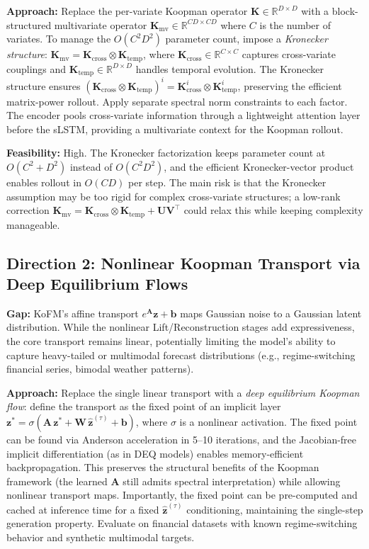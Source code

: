 \documentclass[11pt,a4paper]{article}
\begin{document}
\textbf{Approach:} Replace the per-variate Koopman operator $\mathbf{K} \in \mathbb{R}^{D \times D}$ with a block-structured multivariate operator $\mathbf{K}_{\mathrm{mv}} \in \mathbb{R}^{CD \times CD}$ where $C$ is the number of variates. To manage the $O(C^2 D^2)$ parameter count, impose a \emph{Kronecker structure}: $\mathbf{K}_{\mathrm{mv}} = \mathbf{K}_{\mathrm{cross}} \otimes \mathbf{K}_{\mathrm{temp}}$, where $\mathbf{K}_{\mathrm{cross}} \in \mathbb{R}^{C \times C}$ captures cross-variate couplings and $\mathbf{K}_{\mathrm{temp}} \in \mathbb{R}^{D \times D}$ handles temporal evolution. The Kronecker structure ensures $(\mathbf{K}_{\mathrm{cross}} \otimes \mathbf{K}_{\mathrm{temp}})^i = \mathbf{K}_{\mathrm{cross}}^i \otimes \mathbf{K}_{\mathrm{temp}}^i$, preserving the efficient matrix-power rollout. Apply separate spectral norm constraints to each factor. The encoder pools cross-variate information through a lightweight attention layer before the sLSTM, providing a multivariate context for the Koopman rollout.

\textbf{Feasibility:} High. The Kronecker factorization keeps parameter count at $O(C^2 + D^2)$ instead of $O(C^2 D^2)$, and the efficient Kronecker-vector product enables rollout in $O(CD)$ per step. The main risk is that the Kronecker assumption may be too rigid for complex cross-variate structures; a low-rank correction $\mathbf{K}_{\mathrm{mv}} = \mathbf{K}_{\mathrm{cross}} \otimes \mathbf{K}_{\mathrm{temp}} + \mathbf{U}\mathbf{V}^\top$ could relax this while keeping complexity manageable.

\subsection{Direction 2: Nonlinear Koopman Transport via Deep Equilibrium Flows}
\textbf{Gap:} KoFM's affine transport $e^{\mathbf{A}}\mathbf{z} + \mathbf{b}$ maps Gaussian noise to a Gaussian latent distribution. While the nonlinear Lift/Reconstruction stages add expressiveness, the core transport remains linear, potentially limiting the model's ability to capture heavy-tailed or multimodal forecast distributions (e.g., regime-switching financial series, bimodal weather patterns).

\textbf{Approach:} Replace the single linear transport with a \emph{deep equilibrium Koopman flow}: define the transport as the fixed point of an implicit layer $\mathbf{z}^* = \sigma(\mathbf{A}\,\mathbf{z}^* + \mathbf{W}\,\hat{\mathbf{z}}^{(\tau)} + \mathbf{b})$, where $\sigma$ is a nonlinear activation. The fixed point can be found via Anderson acceleration in 5--10 iterations, and the Jacobian-free implicit differentiation (as in DEQ models) enables memory-efficient backpropagation. This preserves the structural benefits of the Koopman framework (the learned $\mathbf{A}$ still admits spectral interpretation) while allowing nonlinear transport maps. Importantly, the fixed point can be pre-computed and cached at inference time for a fixed $\hat{\mathbf{z}}^{(\tau)}$ conditioning, maintaining the single-step generation property. Evaluate on financial datasets with known regime-switching behavior and synthetic multimodal targets.
\end{document}
